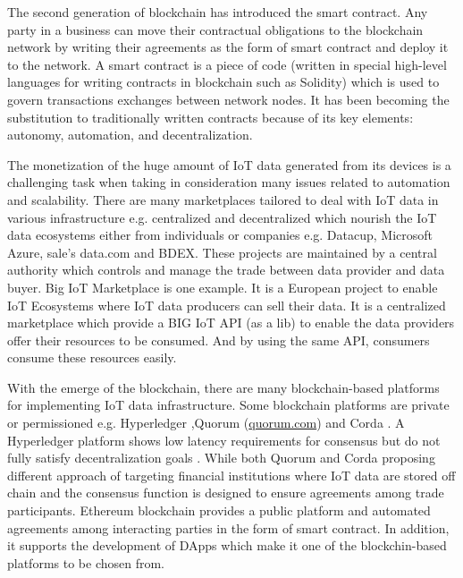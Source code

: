 \documentclass[letterpaper, 10 pt, conference]{ieeeconf}  %
\begin{document}
The second generation of blockchain has introduced the smart contract. Any party in a business can move their contractual obligations to the blockchain network by writing their agreements as the form of smart contract and deploy it to the network. A smart contract is a piece of code (written in special high-level languages for writing contracts in blockchain such as Solidity) which is used to govern transactions exchanges between network nodes. It has been becoming the substitution to traditionally written contracts because of its key elements: autonomy, automation, and decentralization\cite{8}.  

The monetization of the huge amount of IoT data generated from its devices is a challenging task when taking in consideration many issues related to automation and scalability. There are many marketplaces tailored to deal with IoT data in various infrastructure e.g. centralized and decentralized which nourish the IoT data ecosystems either from individuals or companies e.g. Datacup, Microsoft Azure, sale’s data.com and BDEX. These projects are maintained by a central authority which controls and manage the trade between data provider and data buyer. Big IoT Marketplace \cite{14} is one example. It is a European project to enable IoT Ecosystems where IoT data producers can sell their data. It is a centralized marketplace which provide a BIG IoT API (as a lib) to enable the data providers offer their resources to be consumed. And by using the same API, consumers consume these resources easily. 
 
 With the emerge of the blockchain, there are many blockchain-based platforms for implementing IoT data infrastructure. Some blockchain platforms are private or permissioned e.g. Hyperledger \cite{15},Quorum (\url{quorum.com}) \cite{16} and Corda \cite{17}. A Hyperledger platform shows low latency requirements for consensus but do not fully satisfy decentralization goals \cite{18}. While both Quorum and Corda proposing different approach of targeting financial institutions where IoT data are stored off chain and the consensus function is designed to ensure agreements among trade participants. Ethereum blockchain provides a public platform and automated agreements among interacting parties in the form of smart contract. In addition, it supports the development of DApps which make it one of the blockchin-based platforms to be chosen from. 
\end{document}
